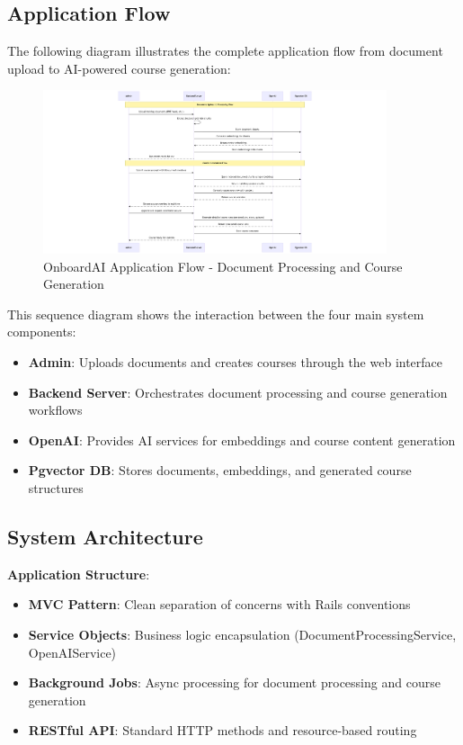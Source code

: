 \documentclass[a4paper,11pt]{article}
\begin{document}
\subsection{Application Flow}

The following diagram illustrates the complete application flow from document upload to AI-powered course generation:

\begin{figure}[htbp]
    \centering
    \includegraphics[width=0.9\textwidth]{ApplicationFlow.png}
    \caption{OnboardAI Application Flow - Document Processing and Course Generation}
    \label{fig:application-flow}
\end{figure}

This sequence diagram shows the interaction between the four main system components:
\begin{itemize}
    \item \textbf{Admin}: Uploads documents and creates courses through the web interface
    \item \textbf{Backend Server}: Orchestrates document processing and course generation workflows
    \item \textbf{OpenAI}: Provides AI services for embeddings and course content generation
    \item \textbf{Pgvector DB}: Stores documents, embeddings, and generated course structures
\end{itemize}

\subsection{System Architecture}

\textbf{Application Structure}:
\begin{itemize}
    \item \textbf{MVC Pattern}: Clean separation of concerns with Rails conventions
    \item \textbf{Service Objects}: Business logic encapsulation (DocumentProcessingService, OpenAIService)
    \item \textbf{Background Jobs}: Async processing for document processing and course generation
    \item \textbf{RESTful API}: Standard HTTP methods and resource-based routing
\end{itemize}
\end{document}
